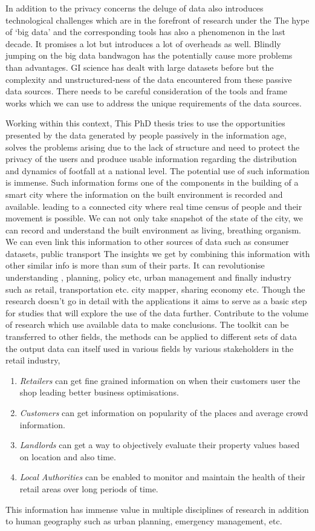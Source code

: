 In addition to the privacy concerns the deluge of data also introduces technological challenges which are in the forefront of research under the  
The hype of `big data' and the corresponding tools has also a phenomenon in the last decade.
It promises a lot but introduces a lot of overheads as well.
Blindly jumping on the big data bandwagon has the potentially cause more problems than advantages.
GI science has dealt with large datasets before but the complexity and unstructured-ness of the data encountered from these passive data sources. 
There needs to be careful consideration of the tools and frame works which we can use to address the unique requirements of the data sources.

Working within this context, This PhD thesis tries to use the opportunities presented by the data generated by people passively in the information age, solves the problems arising due to the lack of structure and need to protect the privacy of the users  and produce usable information regarding the distribution and dynamics of footfall at a national level.
The potential use of such information is immense. 
Such information forms one of the components in the building of a smart city where the information on the  built environment is recorded and available.
leading to a connected city where real time census of people and their movement is possible. 
We can not only take snapshot of the state of the city, we can record and understand the built environment as living, breathing organism. 
We can even link this information to other sources of data such as consumer datasets, public transport 
The insights we get by combining this information with other similar info is more than sum of their parts. 
It can revolutionise understanding , planning, policy etc, urban management and finally industry such as retail, transportation etc. city mapper, sharing economy etc.
Though the research doesn't go in detail with the applications it aims to serve as a basic step for studies that will explore the use of the data further.
Contribute to the volume of research which use available data to make conclusions.
The toolkit can be transferred to other fields, the methods can be applied to different sets of data the output data can itself used in various fields by various stakeholders in the retail industry,
\begin{enumerate}[leftmargin=2em, rightmargin=2em]
  \item \textit{Retailers} can get fine grained information on when their customers user the shop leading better business optimisations.
  \item \textit{Customers} can get information on popularity of the places and average crowd information.
  \item \textit{Landlords} can get a way to objectively evaluate their property values based on location and also time.
  \item \textit{Local Authorities} can be enabled to monitor and maintain the health of their retail areas over long periods of time. 
\end{enumerate}
This information has immense value in multiple disciplines of research in addition to human geography such as urban planning, emergency management, etc.

